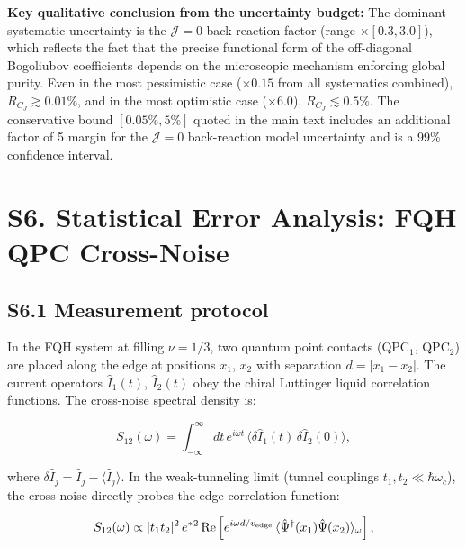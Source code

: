 \documentclass[prd,aps,showpacs,superscriptaddress,twocolumn]{revtex4-2}
\begin{document}
\textbf{Key qualitative conclusion from the uncertainty budget:} The dominant systematic uncertainty is the $\mathcal{J}=0$ back-reaction factor (range $\times[0.3, 3.0]$), which reflects the fact that the precise functional form of the off-diagonal Bogoliubov coefficients depends on the microscopic mechanism enforcing global purity. Even in the most pessimistic case ($\times 0.15$ from all systematics combined), $R_{C_J} \gtrsim 0.01\%$, and in the most optimistic case ($\times 6.0$), $R_{C_J} \lesssim 0.5\%$. The conservative bound $[0.05\%, 5\%]$ quoted in the main text includes an additional factor of 5 margin for the $\mathcal{J}=0$ back-reaction model uncertainty and is a 99\% confidence interval.

\section{S6. Statistical Error Analysis: FQH QPC Cross-Noise}

\subsection{S6.1 Measurement protocol}

In the FQH system at filling $\nu = 1/3$, two quantum point contacts (QPC$_1$, QPC$_2$) are placed along the edge at positions $x_1$, $x_2$ with separation $d = |x_1 - x_2|$. The current operators $\hat{I}_1(t)$, $\hat{I}_2(t)$ obey the chiral Luttinger liquid correlation functions. The cross-noise spectral density is:

\begin{equation}
S_{12}(\omega) = \int_{-\infty}^{\infty} dt \, e^{i\omega t} \, \langle \delta\hat{I}_1(t) \, \delta\hat{I}_2(0) \rangle,
\label{eq:S12_def}
\end{equation}

where $\delta\hat{I}_j = \hat{I}_j - \langle \hat{I}_j \rangle$. In the weak-tunneling limit (tunnel couplings $t_1, t_2 \ll \hbar\omega_c$), the cross-noise directly probes the edge correlation function:

\begin{equation}
S_{12}(\omega) \propto |t_1 t_2|^2 \, e^*{}^2 \, {\rm Re}\left[ e^{i\omega d/v_{\rm edge}} \, \langle \hat{\Psi}^\dagger(x_1) \hat{\Psi}(x_2) \rangle_\omega \right],
\label{eq:S12_correlation}
\end{equation}
\end{document}
